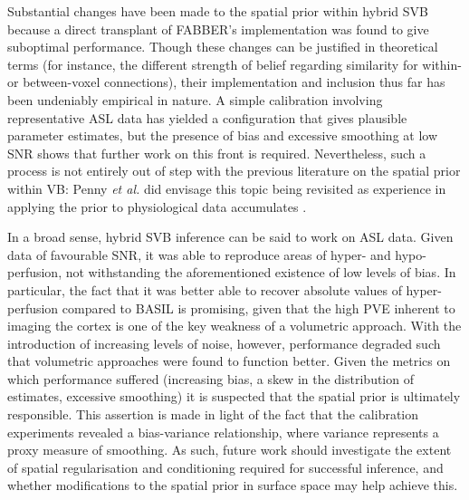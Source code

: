 Substantial changes have been made to the spatial prior within hybrid SVB because a direct transplant of FABBER's implementation was found to give suboptimal performance. Though these changes can be justified in theoretical terms (for instance, the different strength of belief regarding similarity for within- or between-voxel connections), their implementation and inclusion thus far has been undeniably empirical in nature. A simple calibration involving representative ASL data has yielded a configuration that gives plausible parameter estimates, but the presence of bias and excessive smoothing at low SNR shows that further work on this front is required. Nevertheless, such a process is not entirely out of step with the previous literature on the spatial prior within VB: Penny \textit{et al.} did envisage this topic being revisited as experience in applying the prior to physiological data accumulates \cite{Penny2005}. 

In a broad sense, hybrid SVB inference can be said to work on ASL data. Given data of favourable SNR, it was able to reproduce areas of hyper- and hypo-perfusion, not withstanding the aforementioned existence of low levels of bias. In particular, the fact that it was better able to recover absolute values of hyper-perfusion compared to BASIL is promising, given that the high PVE inherent to imaging the cortex is one of the key weakness of a volumetric approach. With the introduction of increasing levels of noise, however, performance degraded such that volumetric approaches were found to function better. Given the metrics on which performance suffered (increasing bias, a skew in the distribution of estimates, excessive smoothing) it is suspected that the spatial prior is ultimately responsible. This assertion is made in light of the fact that the calibration experiments revealed a bias-variance relationship, where variance represents a proxy measure of smoothing. As such, future work should investigate the extent of spatial regularisation and conditioning required for successful inference, and whether modifications to the spatial prior in surface space may help achieve this. 
